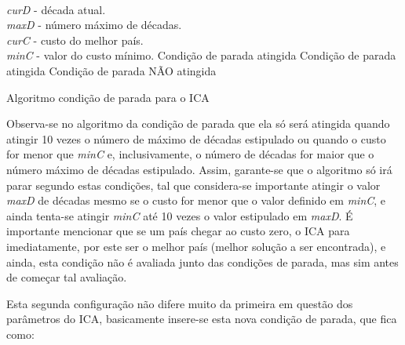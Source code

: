  \begin{algorithm}[h]
\SetAlgoLined
\KwData
{
\\ \emph{curD} - década atual.
\\ \emph{maxD} - número máximo de décadas.
\\ \emph{curC} - custo do melhor país.
\\ \emph{minC} - valor do custo mínimo.
}
    {
    	\KwRetorna Condição de parada atingida\;
    }
    {
     	{
        	\KwRetorna Condição de parada atingida\;
        }
    }
   \KwRetorna Condição de parada NÃO atingida\;

 \caption{Algoritmo condição de parada para o ICA}
\label{alg:FpCP}
\end{algorithm}

Observa-se no algoritmo da condição de parada que ela só será atingida quando atingir 10 vezes o número de máximo de décadas estipulado ou quando o custo for menor que \emph{minC} e, inclusivamente, o número de décadas for maior que o número máximo de décadas estipulado. Assim, garante-se que o algoritmo só irá parar segundo estas condições, tal que considera-se importante atingir o valor \emph{maxD} de décadas mesmo se o custo for menor que o valor definido em  \emph{minC}, e ainda tenta-se atingir \emph{minC} até 10 vezes o valor estipulado em \emph{maxD}. É importante mencionar que se um país chegar ao custo zero, o ICA para imediatamente, por este ser o melhor país (melhor solução a ser encontrada), e ainda, esta condição não é avaliada junto das condições de parada, mas sim antes de começar tal avaliação.

Esta segunda configuração não difere muito da primeira em questão dos parâmetros do ICA, basicamente insere-se esta nova condição de parada, que fica como:


